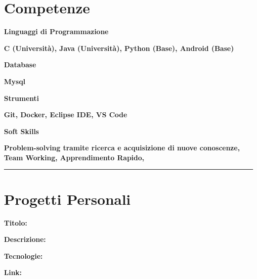\documentclass{article}
\newenvironment{listaIdentazione}[1]{
			\begin{list}{}{
			  \setlength{\leftmargin}{#1} %
			  \setlength{\itemsep}{0pt}	%
			  \setlength{\parskip}{0pt} %
			  \setlength{\parsep}{0pt} %
			  \setlength{\labelwidth}{0pt} %
			  \setlength{\labelsep}{0pt} %
			  \renewcommand{\makelabel}[1]{} %
			  }
			}{\end{list}}
\newcommand{\spaziocorto}{\\[0.1cm]}
\newcommand{\spaziolungo}{\\[0.3cm]}
\begin{document}
\section*{\large{Competenze}}
\begin{flushleft}
		\textbf{\normalsize{Linguaggi di Programmazione}}
		\spaziocorto
			\begin{listaIdentazione}{0.5cm}
			\item{\textbf{\normalsize{C (Università), Java (Università), Python (Base),
			Android (Base)}}}
			\spaziocorto
			\end{listaIdentazione}
						
		\textbf{\normalsize{Database}}
		\spaziocorto
			\begin{listaIdentazione}{0.5cm}
			\item{\textbf{\normalsize{Mysql}}}
			\spaziocorto
			\end{listaIdentazione}
			
		\textbf{\normalsize{Strumenti}}
		\spaziocorto
			\begin{listaIdentazione}{0.5cm}
			\item{\textbf{\normalsize{Git, Docker, Eclipse IDE, VS Code}}}
			\spaziocorto
			\end{listaIdentazione}
			
		\textbf{\normalsize{Soft Skills}}
		\spaziocorto
			\begin{listaIdentazione}{0.5cm}
			\item{\textbf{\normalsize{Problem-solving tramite ricerca e acquisizione di nuove conoscenze, Team Working, Apprendimento Rapido, }}}
			\spaziocorto
			\end{listaIdentazione}
\end{flushleft}

\hrule

\section*{\large{Progetti Personali}}
	\begin{flushleft}
		\textbf{\normalsize{Titolo: }}
		\spaziocorto
			\begin{listaIdentazione}{0.5cm}
			\item {\textbf{\normalsize{Descrizione: }}}
			\spaziocorto
			\item {\textbf{\normalsize{Tecnologie: }}}
			\spaziocorto
			\item {\textbf{\normalsize{Link: }}}
			\spaziolungo
			\end{listaIdentazione}
\end{flushleft}
\end{document}
